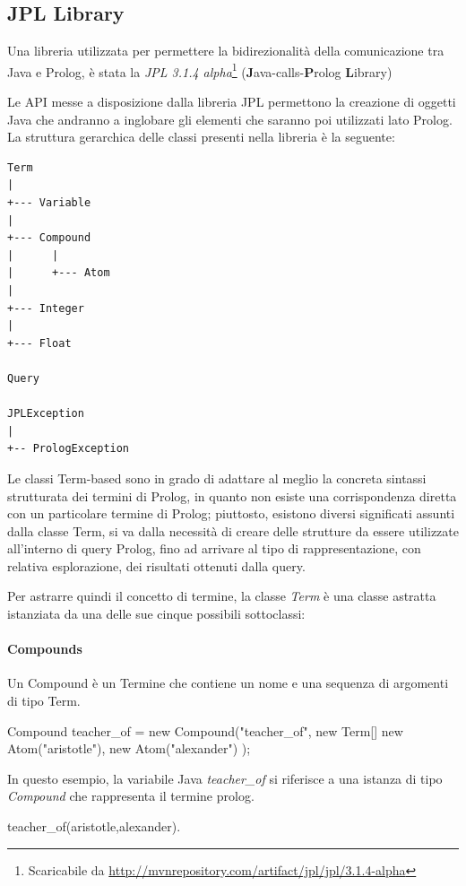 \subsection{JPL Library}
\label{JPL}
\nocite{swi:jpl}
Una libreria utilizzata per permettere la bidirezionalità della comunicazione tra Java e Prolog, è stata la \emph{JPL 3.1.4 alpha}\footnote{Scaricabile da \url{http://mvnrepository.com/artifact/jpl/jpl/3.1.4-alpha}} (\textbf{J}ava-calls-\textbf{P}rolog \textbf{L}ibrary)

Le API messe a disposizione dalla libreria JPL permettono la creazione di oggetti Java che andranno a inglobare gli elementi che saranno poi utilizzati lato Prolog. La struttura gerarchica delle classi presenti nella libreria è la seguente:
\begin{Verbatim}
Term
|
+--- Variable
|
+--- Compound
|      |
|      +--- Atom
|
+--- Integer
|
+--- Float

Query

JPLException
|
+-- PrologException
\end{Verbatim}

Le classi Term-based sono in grado di adattare al meglio la concreta sintassi strutturata dei termini di Prolog, in quanto non esiste una corrispondenza diretta con un particolare termine di Prolog; piuttosto, esistono diversi significati assunti dalla classe Term, si va dalla necessità di creare delle strutture da essere utilizzate all'interno di query Prolog, fino ad arrivare al tipo di rappresentazione, con relativa esplorazione, dei risultati ottenuti dalla query.

Per astrarre quindi il concetto di termine, la classe \emph{Term} è una classe astratta istanziata da una delle sue cinque possibili sottoclassi:
\clearpage
\paragraph{Compounds}
Un Compound è un Termine che contiene un nome e una sequenza di argomenti di tipo Term.

\begin{javacode}
	Compound teacher_of = new Compound("teacher_of",
	new Term[] {
		new Atom("aristotle"),
		new Atom("alexander")
	}
	);
\end{javacode}

In questo esempio, la variabile Java \emph{teacher\_of} si riferisce a una istanza di tipo \emph{Compound} che rappresenta il termine prolog.

\begin{prologcode}
	teacher_of(aristotle,alexander).
\end{prologcode}


